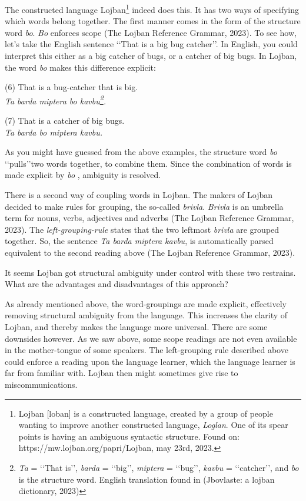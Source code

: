 The constructed language Lojban\footnote{Lojban [lo\textyogh ban] is a constructed language, created by a group of people wanting to improve another constructed language, {\it Loglan}. One of its spear points is having an ambiguous syntactic structure. Found on: https://mw.lojban.org/papri/Lojban, may 23rd, 2023.} indeed does this. It has two ways of specifying which words belong together. The first manner comes in the form of the structure word {\it bo}. \def\bo{{\it bo} } {\it Bo} enforces scope (The Lojban Reference Grammar, 2023). To see how, let's take the English sentence \lq\lq That is a big bug catcher\rq\rq. In English, you could interpret this either as a big catcher of bugs, or a catcher of big bugs. In Lojban, the word \bo makes this difference explicit:


\begin{center}
	{\center (6) That is a bug-catcher that is big.\\ {\it Ta barda miptera bo kavbu\footnote{{\it Ta} = \lq\lq That is\rq\rq, {\it barda} = \lq\lq big\rq\rq, {\it miptera} = \lq\lq bug\rq\rq, {\it kavbu} = \lq\lq catcher\rq\rq, and \bo is the structure word. English translation found in  (Jbovlaste: a lojban dictionary, 2023)}.}}

{\center (7) That is a catcher of big bugs. \\}
{\it Ta barda bo miptera kavbu.}
\end{center}
\vspace{0.1cm}

\noindent As you might have guessed from the above examples, the structure word \bo \lq\lq pulls\rq\rq two words together, to combine them. Since the combination of words is made explicit by \bo, ambiguity is resolved. 

There is a second way of coupling words in Lojban. The makers of Lojban decided to make rules for grouping, the so-called {\it brivla}. {\it Brivla} is an umbrella term for nouns, verbs, adjectives and adverbs (The Lojban Reference Grammar, 2023). The {\it left-grouping-rule} states that the two leftmost {\it brivla} are grouped together. So, the sentence {\it Ta barda miptera kavbu}, is automatically parsed equivalent to the second reading above (The Lojban Reference Grammar, 2023). 

It seems Lojban got structural ambiguity under control with these two restrains. What are the advantages and disadvantages of this approach?

As already mentioned above, the word-groupings are made explicit, effectively removing structural ambiguity from the language. This increases the clarity of Lojban, and thereby makes the language more universal. There are some downsides however. As we saw above, some scope readings are not even available in the mother-tongue of some speakers. The left-grouping rule described above could enforce a reading upon the language learner, which the language learner is far from familiar with. Lojban then might sometimes give rise to miscommunications. 

